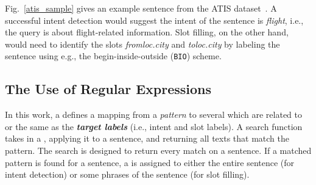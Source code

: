  Fig.~\ref{atis_sample} gives an example sentence from the ATIS dataset~\cite{hemphill1990atis}. A successful intent
detection would suggest the intent of the sentence is \emph{flight}, i.e., the query is about flight-related information. Slot filling,
on the other hand, would need to identify the slots \emph{fromloc.city} and \emph{toloc.city} by labeling the sentence using e.g.,
the begin-inside-outside (\texttt{BIO}) scheme.




%


\subsection{The Use of Regular Expressions}
\label{re_desc}

In this work, a \RE defines a mapping from a \emph{pattern} to several \textbf{\emph{\REtags}} which are related to or the same as the
\textbf{\emph{target labels}} (i.e., intent and slot labels). A search function takes in a \RE, applying it to a sentence, and returning
all texts that match the pattern. The search is designed to return every match on a sentence. If a matched pattern is found for a sentence,
a \REtag is assigned to either the entire sentence (for intent detection) or some phrases of the sentence (for slot filling).


